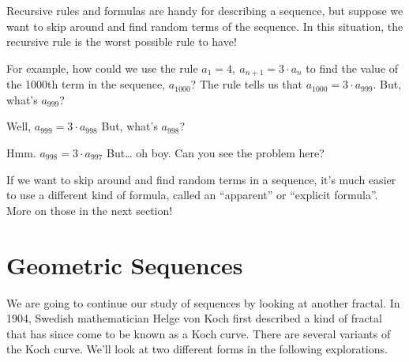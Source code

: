 Recursive rules and formulas are handy for describing a sequence, but suppose we want to skip around and find random terms of the sequence. In this situation, the recursive rule is the worst possible rule to have!

For example, how could we use the rule $a_1 = 4, ~ a_{n+1} = 3 \cdot a_n$ to find the value of the 1000th term in the sequence, $a_{1000}$? The rule tells us that $a_{1000} = 3 \cdot a_{999}$. But, what's $a_{999}$?

Well, $a_{999} = 3 \cdot a_{998}$ But, what's $a_{998}$?

Hmm. $a_{998} = 3 \cdot a_{997}$ But\ldots{} oh boy. Can you see the problem here?

If we want to skip around and find random terms in a sequence, it's much easier to use a different kind of formula, called an ``apparent'' or ``explicit formula''. More on those in the next section!


\section{Geometric Sequences}
\label{sec:geometricseq}

We are going to continue our study of sequences by looking at another fractal. In 1904, Swedish mathematician Helge von Koch first described a kind of fractal that has since come to be known as a Koch curve. There are several variants of the Koch curve. We'll look at two different forms in the following explorations.

\begin{boxedexplore}
\end{boxedexplore}


